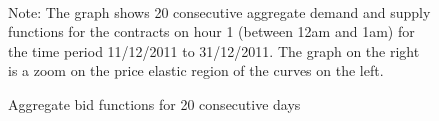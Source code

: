 \begin{figure}[!ht]
\vspace{0.3cm}
\begin{center}\\
\vspace{0.05cm}
\caption{Aggregate bid functions for 20 consecutive days}
\label{graphmultifunc}
\end{center}
{\small Note: The graph shows 20 consecutive aggregate demand and supply functions for the contracts on hour 1 (between 12am and 1am) for the time period 11/12/2011 to 31/12/2011. The graph on the right is a zoom on the price elastic region of the curves on the left.}
\end{figure}



\begin{center}

\end{center}



